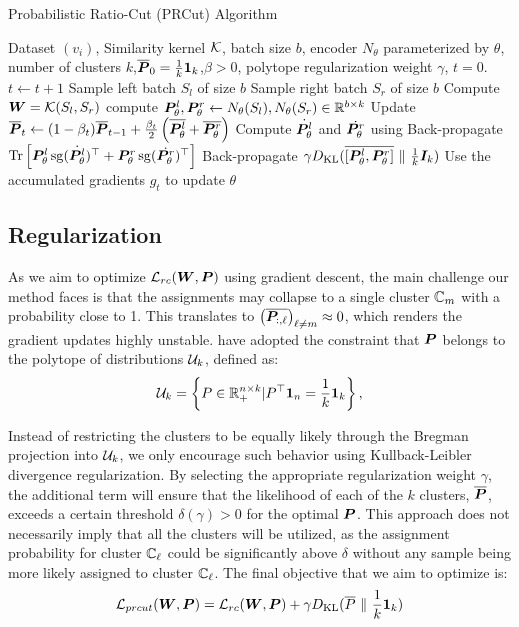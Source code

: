 \begin{algorithm}[t]
	\caption{Probabilistic Ratio-Cut (PRCut) Algorithm}\label{alg:prcut}
	\begin{algorithmic}[1]
		\REQUIRE Dataset $(v_i)$, Similarity kernel ${\mathcal{K}}$, batch size $b$,
		encoder $N_\theta$ parameterized by $\theta$, number of clusters $k$,$\overline{{\bm{P}}}_0={\frac{1}{k}}{\bm{1}}_k$,$\beta>0$,
		polytope regularization weight $\gamma$, $t= 0$.
		\STATE $t\gets t+1$
		\STATE Sample left batch $S_l$ of size $b$
		\STATE Sample right batch $S_r$ of size $b$
		\STATE Compute ${\bm{W}} = {\mathcal{K}}(S_l,S_r)$
		\STATE compute ${\bm{P}}_\theta^l, {\bm{P}}_\theta^r \gets N_\theta(S_l),N_\theta(S_r)\in{{\mathbb{R}}^{b\times k}}$
		\STATE Update $\overline{{\bm{P}}}_t \gets (1-\beta_t)\overline{{\bm{P}}}_{t-1} +\frac{\beta_t}{2}\left(\overline{{\bm{P}}_\theta^l} + \overline{{\bm{P}}_\theta^r}\right)$
		\STATE Compute $\dot{{\bm{P}}_\theta^l}$ and $\dot{{\bm{P}}_\theta^r}$ using 
		\STATE Back-propagate $\operatorname{Tr}\left[{\bm{P}}_\theta^l \operatorname{sg}(\dot{{\bm{P}}_\theta^l})^\top +{\bm{P}}_\theta^r\operatorname{sg}(\dot{{\bm{P}}_\theta^r})^\top\right]$
		\STATE Back-propagate $\gamma D_{\rm KL}(\overline{[{\bm{P}}_\theta^l, {\bm{P}}_\theta^r]} \ \| \ {\frac{1}{k}}{\bm{I}}_k)$
		\STATE Use the accumulated gradients $g_t$ to update $\theta$
		\ENDWHILE
	\end{algorithmic}
\end{algorithm}
\subsection{Regularization}
As we aim to optimize ${\mathcal{L}}_{rc}({\bm{W}}, {\bm{P}})$ using gradient descent, the main
challenge our method faces is that the assignments may collapse to a single cluster
${\mathbb{C}}_m$ with a probability close to 1. This translates to
$\left(\overline{{\bm{P}}_{:,\ell}}\right)_{\ell\neq m}\approx 0$, which renders the gradient updates
highly unstable. \citet{sinkhorn} have adopted the constraint that ${\bm{P}}$ belongs to
the polytope of distributions ${\mathcal{U}}_k$, defined as:
\[
	{\mathcal{U}}_k=\left\lbrace P\in {\mathbb{R}}_{+}^{n\times k} | P^\top {\bm{1}}_{n} = {\frac{1}{k}}{\bm{1}}_{k} \right\rbrace,
\]

Instead of restricting the clusters to be equally likely through the Bregman
projection into ${\mathcal{U}}_k$, we only encourage such behavior using Kullback-Leibler
divergence regularization. By selecting the appropriate regularization weight
$\gamma$, the additional term will ensure that the likelihood of each of the $k$
clusters, $\overline{{\bm{P}}}$, exceeds a certain threshold $\delta(\gamma) > 0$ for the
optimal ${\bm{P}}$. This approach does not necessarily imply that all the clusters will
be utilized, as the assignment probability for cluster ${\mathbb{C}}_\ell$ could be
significantly above $\delta$ without any sample being more likely assigned to
cluster ${\mathbb{C}}_\ell$. The final objective that we aim to optimize is:
\[
	{\mathcal{L}}_{prcut}({\bm{W}},{\bm{P}}) = {\mathcal{L}}_{rc}({\bm{W}},{\bm{P}}) + \gamma D_{\rm KL}(\overline{P} \ \| \ {\frac{1}{k}}{\bm{1}}_k)
\]

